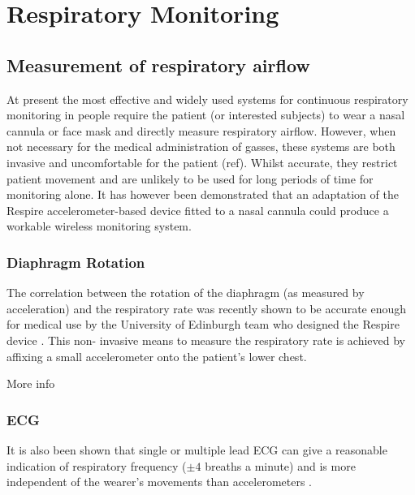 \section{Respiratory Monitoring}

\subsection{Measurement of respiratory airflow}
At present the most effective and widely used systems for continuous respiratory monitoring in
people require the patient (or interested subjects) to wear a nasal cannula or face mask and directly
measure respiratory airflow. However, when not necessary for the medical administration of gasses,
these systems are both invasive and uncomfortable for the patient (ref). Whilst accurate, they
restrict patient movement and are unlikely to be used for long periods of time for monitoring alone.
It has however been demonstrated that an adaptation of the Respire accelerometer-based device
fitted to a nasal cannula could produce a workable wireless monitoring system.

\subsubsection{Diaphragm Rotation}
The correlation between the rotation of the diaphragm (as measured by acceleration) and the
respiratory rate was recently shown to be accurate enough for medical use by the University of
Edinburgh team who designed the Respire device \cite{BatesLingMannArvind2010}. This non-
invasive means to measure the respiratory rate is achieved by affixing a small accelerometer onto
the patient's lower chest.


More info


\subsubsection{\acf{ECG}}
It is also been shown that single or multiple lead \ac{ECG} can give a reasonable indication of respiratory
frequency ($\pm4$ breaths a minute) and is more independent of the wearer's movements than
accelerometers \cite{ZhaoZhaoQun2008, BoyleBidargaddiSarelaKarunanithi2009}.

